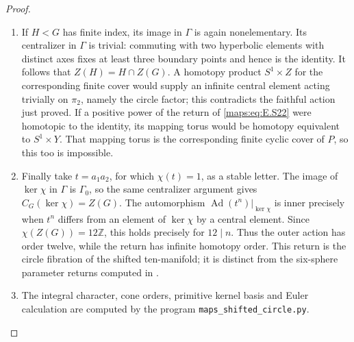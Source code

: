 \begin{proof}
\begin{enumerate}[label={$\langle1\rangle$\arabic*.},leftmargin=*]
\item If $H<G$ has finite index, its image in $\Gamma$ is again
nonelementary. Its centralizer in $\Gamma$ is trivial:
commuting with two hyperbolic elements with distinct axes
fixes at least three boundary points and hence is the
identity. It follows that
$Z(H)=H\cap Z(G)$. A homotopy product $S^1\times Z$ for
the corresponding finite cover would supply an infinite
central element acting trivially on $\pi_2$, namely the
circle factor; this contradicts the faithful action just
proved. If a positive power of the return of \eqref{maps:eq:E.S22} were
homotopic to the identity, its mapping torus would be
homotopy equivalent to $S^1\times Y$. That mapping torus
is the corresponding finite cyclic cover of $P$, so this
too is impossible.

\item Finally take $t=a_1a_2$, for which $\chi(t)=1$, as a
stable letter. The image of $\ker\chi$ in $\Gamma$ is
$\Gamma_0$, so the same centralizer argument gives
$C_G(\ker\chi)=Z(G)$. The automorphism
$\operatorname{Ad}(t^n)|_{\ker\chi}$ is inner precisely
when $t^n$ differs from an element of $\ker\chi$ by a
central element. Since $\chi(Z(G))=12\mathbb Z$, this
holds precisely for $12\mid n$. Thus the outer action has
order twelve, while the return has infinite homotopy
order. This return is the circle fibration of the shifted
ten-manifold; it is distinct from the six-sphere parameter
returns computed in .

\item The integral character, cone orders, primitive kernel basis and Euler calculation are computed by the program \texttt{maps\_shifted\_circle.py}.
\end{enumerate}
\end{proof}


